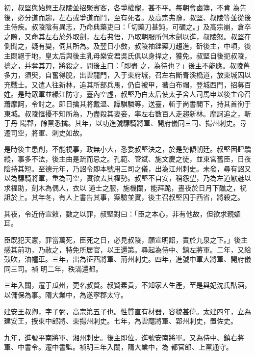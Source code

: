 \begin{pinyinscope}
 初，叔堅與始興王叔陵並招聚賓客，各爭權寵，甚不平。每朝會鹵簿，不肯
 為先後，必分道而趨，左右或爭道而鬥，至有死者。及高宗弗豫，叔堅、叔陵等並從後主侍疾。叔陵陰有異志，乃命典藥吏曰：「切藥刀甚鈍，可礪之。」及高宗崩，倉卒之際，又命其左右於外取劍，左右弗悟，乃取朝服所佩木劍以進，叔陵怒。叔堅在側聞之，疑有變，伺其所為。及翌日小斂，叔陵袖銼藥刀趨進，斫後主，中項，後主悶絕于地，皇太后與後主乳母樂安君吳氏俱以身捍之，獲免。叔堅自後扼叔陵，擒之，并奪其刀，將殺之，問後主曰：「即盡
 之，為待也？」後主不能應。叔陵舊多力，須臾，自奮得脫，出雲龍門，入于東府城，召左右斷青溪橋道，放東城囚以充戰士。又遣人往新林，追其所部兵馬，仍自被甲，著白布帽，登城西門，招募百姓。是時眾軍並緣江防守，臺內空虛，叔堅乃白太后使太子舍人司馬申以後主命召蕭摩訶，令討之。即日擒其將戴溫、譚騏驎等，送臺，斬于尚書閣下，持其首徇于東城。叔陵恇擾不知所為，乃盡殺其妻妾，率左右數百人走趨新林。摩訶追之，斬于丹
 陽郡，餘黨悉擒。其年，以功進號驃騎將軍、開府儀同三司、揚州刺史。尋遷司空，將軍、刺史如故。



 是時後主患創，不能視事，政無小大，悉委叔堅決之，於是勢傾朝廷。叔堅因肆驕縱，事多不法，後主由是疏而忌之。孔範、管斌、施文慶之徒，並東宮舊臣，日夜陰持其短。至德元年，乃詔令即本號用三司之儀，出為江州刺史。未發，尋有詔又以為驃騎將軍，重為司空，實欲去其權勢。叔堅不自安，稍怨望，乃為左道厭魅以求福助，刻木為偶人，衣以
 道士之服，施機關，能拜跪，晝夜於日月下醮之，祝詛於上。其年冬，有人上書告其事，案驗並實，後主召叔堅囚于西省，將殺之。



 其夜，令近侍宣敕，數之以罪，叔堅對曰：「臣之本心，非有他故，但欲求親媚耳。



 臣既犯天憲，罪當萬死，臣死之日，必見叔陵，願宣明詔，責於九泉之下。」後主感其前功，乃赦之，特免所居官，以王還第。尋起為侍中、鎮左將軍。二年，又給鼓吹，油幢車。三年，出為征西將軍、荊州刺史。四年，進號中軍大將軍、開府儀同三司。禎
 明二年，秩滿還都。



 三年入關，遷于瓜州，更名叔賢。叔賢素貴，不知家人生產，至是與妃沈氏酤酒，以傭保為事。隋大業中，為遂寧郡太守。



 建安王叔卿，字子弼，高宗第五子也。性質直有材器，容貌甚偉。太建四年，立為建安王，授東中郎將、東揚州刺史。七年，為雲麾將軍、郢州刺史，置佐史。



 九年，進號平南將軍、湘州刺史。後主即位，進號安南將軍。又為侍中、鎮右將軍、中書令。遷中書監。禎明三年入關，隋大業中，為
 都官郎、上黨通守。




\end{pinyinscope}
